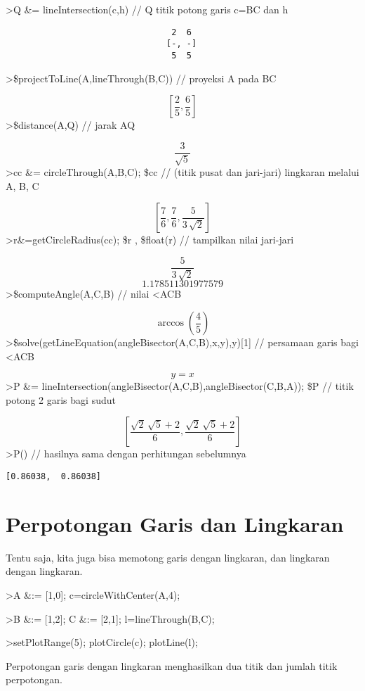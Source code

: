 \documentclass[
]{book}
\begin{document}
\textgreater Q \&= lineIntersection(c,h) // Q titik potong garis c=BC dan h

\begin{verbatim}
                                 2  6
                                [-, -]
                                 5  5
\end{verbatim}

\textgreater\$projectToLine(A,lineThrough(B,C)) // proyeksi A pada BC

\[\left[ \frac{2}{5} , \frac{6}{5} \right] \]\textgreater\$distance(A,Q) // jarak AQ

\[\frac{3}{\sqrt{5}}\]\textgreater cc \&= circleThrough(A,B,C); \$cc // (titik pusat dan jari-jari) lingkaran melalui A, B, C

\[\left[ \frac{7}{6} , \frac{7}{6} , \frac{5}{3\,\sqrt{2}} \right] \]\textgreater r\&=getCircleRadius(cc); \$r , \$float(r) // tampilkan nilai jari-jari

\[\frac{5}{3\,\sqrt{2}}\]\[1.178511301977579\]\textgreater\$computeAngle(A,C,B) // nilai \textless ACB

\[\arccos \left(\frac{4}{5}\right)\]\textgreater\$solve(getLineEquation(angleBisector(A,C,B),x,y),y){[}1{]} // persamaan garis bagi \textless ACB

\[y=x\]\textgreater P \&= lineIntersection(angleBisector(A,C,B),angleBisector(C,B,A)); \$P // titik potong 2 garis bagi sudut

\[\left[ \frac{\sqrt{2}\,\sqrt{5}+2}{6} , \frac{\sqrt{2}\,\sqrt{5}+2 }{6} \right]\]\textgreater P() // hasilnya sama dengan perhitungan sebelumnya

\begin{verbatim}
[0.86038,  0.86038]
\end{verbatim}

\section{Perpotongan Garis dan Lingkaran}\label{perpotongan-garis-dan-lingkaran}

Tentu saja, kita juga bisa memotong garis dengan lingkaran, dan lingkaran dengan lingkaran.

\textgreater A \&:= {[}1,0{]}; c=circleWithCenter(A,4);

\textgreater B \&:= {[}1,2{]}; C \&:= {[}2,1{]}; l=lineThrough(B,C);

\textgreater setPlotRange(5); plotCircle(c); plotLine(l);

Perpotongan garis dengan lingkaran menghasilkan dua titik dan jumlah titik perpotongan.
\end{document}
